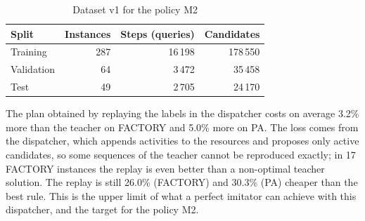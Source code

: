 \begin{table}[htpb]
  \centering
  \small
  \begin{tabular}{@{}lrrr@{}}
    \toprule
    \textbf{Split} & \textbf{Instances} & \textbf{Steps (queries)} & \textbf{Candidates} \\
    \midrule
    Training   & 287 & 16\,198 & 178\,550 \\
    Validation & 64  & 3\,472  & 35\,458 \\
    Test       & 49  & 2\,705  & 24\,170 \\
    \bottomrule
  \end{tabular}
  \caption{Dataset v1 for the policy M2}
  \label{tab:dataset}
\end{table}

The plan obtained by replaying the labels in the dispatcher costs on average 3.2\% more than the
teacher on FACTORY and 5.0\% more on PA. The loss comes from the dispatcher, which appends
activities to the resources and proposes only active candidates, so some sequences of the
teacher cannot be reproduced exactly; in 17 FACTORY instances the replay is even better than a
non-optimal teacher solution. The replay is still 26.0\% (FACTORY) and 30.3\% (PA) cheaper than
the best rule. This is the upper limit of what a perfect imitator can achieve with this
dispatcher, and the target for the policy M2.



